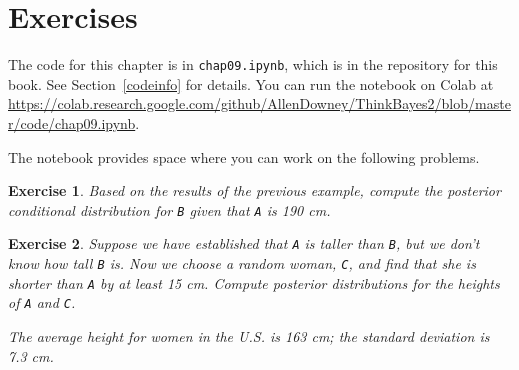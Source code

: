 \documentclass[12pt]{book}
\theoremstyle{exercise}
\newtheorem{exercise}{Exercise}[chapter]
\newcommand{\py}[1]{{\tt #1}}%
\begin{document}
\section{Exercises}

The code for this chapter is in \py{chap09.ipynb}, which is in the repository for this book.  See Section~\ref{codeinfo} for details.
You can run the notebook on Colab at \url{https://colab.research.google.com/github/AllenDowney/ThinkBayes2/blob/master/code/chap09.ipynb}.

The notebook provides space where you can work on the following problems.

\begin{exercise}
Based on the results of the previous example, compute the posterior conditional distribution for \py{B} given that \py{A} is 190 cm.
\end{exercise}


\begin{exercise}
Suppose we have established that \py{A} is taller than \py{B}, but we don't know how tall \py{B} is.
Now we choose a random woman, \py{C}, and find that she is shorter than \py{A} by at least 15 cm.  Compute posterior distributions for the heights of \py{A} and \py{C}.

The average height for women in the U.S. is 163 cm; the standard deviation is 7.3 cm.
\end{exercise}
\end{document}
